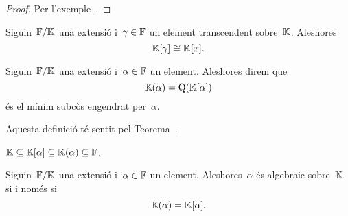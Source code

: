 \documentclass[../../main.tex]{subfiles}
\begin{document}
    \begin{proof}
        Per l'exemple~.
    \end{proof}
    \begin{corollary}
        \label{cor:el-minim-subanell-engendrat-per-un-transcendent-es-isomorfa-a-lanell-de-polinomis}
        Siguin~\(\mathbb{F}/\mathbb{K}\) una extensió i~\(\gamma\in\mathbb{F}\) un element transcendent sobre~\(\mathbb{K}\).
        Aleshores
        \[
            \mathbb{K}[\gamma]\cong\mathbb{K}[x].
        \]
    \end{corollary}
    \begin{definition}
        \label{def:minim-subcos-engendrat-per-un-element-duna-extensio}
        Siguin~\(\mathbb{F}/\mathbb{K}\) una extensió i~\(\alpha\in\mathbb{F}\) un element.
        Aleshores direm que
        \[
            \mathbb{K}(\alpha)=\operatorname{Q}(\mathbb{K}[\alpha])
        \]
        és el mínim subcòs engendrat per~\(\alpha\).

        Aquesta definició té sentit pel Teorema~.
    \end{definition}
    \begin{observation}
        \label{obs:inclusio-del-minim-subanell-i-subcos-engendrats-per-un-element}
        \(\mathbb{K}\subseteq\mathbb{K}[\alpha]\subseteq\mathbb{K}(\alpha)\subseteq\mathbb{F}\).
    \end{observation}
    \begin{lemma}
        \label{lema:un-element-es-algebraic-si-i-nomes-si-el-minim-subanell-engendrat-per-lelement-es-un-cos}
        Siguin~\(\mathbb{F}/\mathbb{K}\) una extensió i~\(\alpha\in\mathbb{F}\) un element.
        Aleshores~\(\alpha\) és algebraic sobre~\(\mathbb{K}\) si i només si
        \[
            \mathbb{K}(\alpha)=\mathbb{K}[\alpha].
        \]
    \end{lemma}
\end{document}
